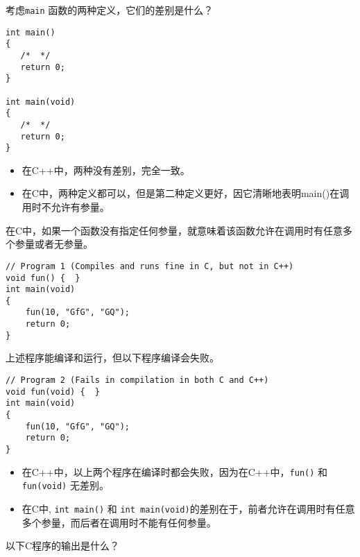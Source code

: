 \begin{frame}[fragile]
考虑\lstinline|main| 函数的两种定义，它们的差别是什么？
\begin{lstlisting}
int main()
{
   /*  */
   return 0;
}

int main(void)
{
   /*  */
   return 0;
}
\end{lstlisting}
\pause
\begin{itemize}
\item 在C++中，两种没有差别，完全一致。
\item 在C中，两种定义都可以，但是第二种定义更好，因它清晰地表明main()在调用时不允许有参量。	
\end{itemize}
\end{frame}

\begin{frame}[fragile]
在C中，如果一个函数没有指定任何参量，就意味着该函数允许在调用时有任意多个参量或者无参量。
 
\begin{lstlisting}
// Program 1 (Compiles and runs fine in C, but not in C++)
void fun() {  } 
int main(void)
{
    fun(10, "GfG", "GQ");
    return 0;
}
\end{lstlisting}
上述程序能编译和运行，但以下程序编译会失败。
 
\begin{lstlisting}
// Program 2 (Fails in compilation in both C and C++)
void fun(void) {  }
int main(void)
{
    fun(10, "GfG", "GQ");
    return 0;
}
\end{lstlisting}
\end{frame}

\begin{frame}[fragile]

\begin{itemize}
\item 在C++中，以上两个程序在编译时都会失败，因为在C++中，\lstinline|fun()| 和 \lstinline|fun(void)| 无差别。\\[.1in]
\item 在C中, \lstinline|int main()| 和 \lstinline|int main(void)|的差别在于，前者允许在调用时有任意多个参量，而后者在调用时不能有任何参量。
\end{itemize}

\end{frame}

\begin{frame}[fragile]
以下C程序的输出是什么？

 


\end{frame}

